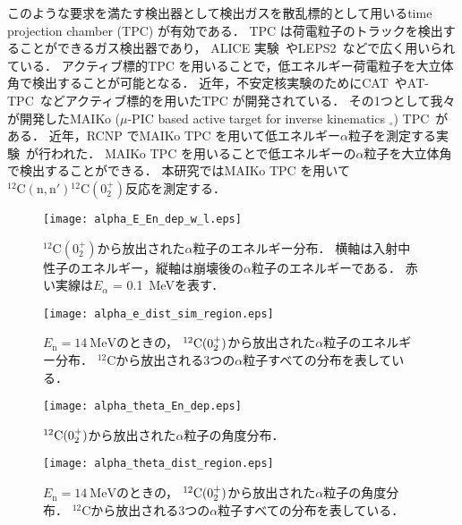 \documentclass[../master]{subfiles}
\begin{document}
このような要求を満たす検出器として検出ガスを散乱標的として用いるtime projection chamber (TPC) が有効である．
TPC は荷電粒子のトラックを検出することができるガス検出器であり，
ALICE 実験~\cite{alice-tpc}やLEPS2~\cite{kobayakawa_thesis}などで広く用いられている．
アクティブ標的TPC を用いることで，低エネルギー荷電粒子を大立体角で検出することが可能となる．
近年，不安定核実験のためにCAT~\cite{cat-tpc}やAT-TPC~\cite{at-tpc}などアクティブ標的を用いたTPC が開発されている．
その1つとして我々が開発したMAIKo ($\mu$-PIC based active target for inverse kinematics $_{\circ}$)
 TPC~\cite{maiko, mupic}がある．
近年，RCNP でMAIKo TPC を用いて低エネルギー$\alpha$粒子を測定する実験~\cite{Furuno2019}が行われた．
MAIKo TPC を用いることで低エネルギーの$\alpha$粒子を大立体角で検出することができる．
本研究ではMAIKo TPC を用いて${}^{12}\mathrm{C}(\mathrm{n},\mathrm{n}'){}^{12}\mathrm{C} (0_2^+)$反応を測定する．
\begin{figure}
  \centering
  \texttt{[image: alpha\_E\_En\_dep\_w\_l.eps]}
  \caption{${}^{12}\mathrm{C} (0_2^+)$から放出された$\alpha$粒子のエネルギー分布．
    横軸は入射中性子のエネルギー，縦軸は崩壊後の$\alpha$粒子のエネルギーである．
    赤い実線は$E_{\alpha}$ = \SI{0.1}{\mega\electronvolt}を表す．}
  \label{fig::alpha_E_En_dep_w_l}
\end{figure}
\begin{figure}
  \centering
  \texttt{[image: alpha\_e\_dist\_sim\_region.eps]}
  \caption[${}^{12}{\rm C} (0_2^+)$から放出された$\alpha$粒子のエネルギー分布．]
          {$E_{\mathrm{n}}=\SI{14}{\mega\electronvolt}$のときの，
            ${}^{12}{\rm C} (0_2^+)$から放出された$\alpha$粒子のエネルギー分布．
            ${}^{12}\mathrm{C}$から放出される3つの$\alpha$粒子すべての分布を表している．}
          \label{fig::alpha_E_dist}
\end{figure}
\begin{figure}
  \centering
  \texttt{[image: alpha\_theta\_En\_dep.eps]}
  \caption{${}^{12}{\rm C} (0_2^+)$から放出された$\alpha$粒子の角度分布．}
  \label{fig::alpha_theta_En_dep}
\end{figure}
\begin{figure}
  \centering
  \texttt{[image: alpha\_theta\_dist\_region.eps]}
  \caption[${}^{12}{\rm C} (0_2^+)$から放出された$\alpha$粒子の角度分布．]
          {$E_{\mathrm{n}}=\SI{14}{\mega\electronvolt}$のときの，
            ${}^{12}{\rm C} (0_2^+)$から放出された$\alpha$粒子の角度分布．
            ${}^{12}\mathrm{C}$から放出される3つの$\alpha$粒子すべての分布を表している．
          }
  \label{fig::alpha_theta_dist}
\end{figure}
\end{document}
